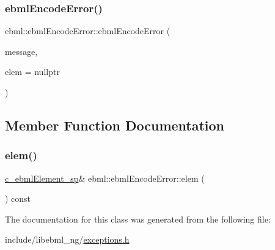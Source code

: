\subsubsection{\texorpdfstring{ebml\+Encode\+Error()}{ebmlEncodeError()}}
{\footnotesize\ttfamily ebml\+::ebml\+Encode\+Error\+::ebml\+Encode\+Error (\begin{DoxyParamCaption}\item[{const std\+::string \&}]{message,  }\item[{const \mbox{\hyperlink{namespaceebml_a2deef4e8071531b32e3533f1bf978917}{c\+\_\+ebml\+Element\+\_\+sp}} \&}]{elem = {\ttfamily nullptr} }\end{DoxyParamCaption})}



\subsection{Member Function Documentation}
\mbox{\label{classebml_1_1ebmlEncodeError_acea050cc554e717e4d9845c0cf34d473}} 
\subsubsection{\texorpdfstring{elem()}{elem()}}
{\footnotesize\ttfamily \mbox{\hyperlink{namespaceebml_a2deef4e8071531b32e3533f1bf978917}{c\+\_\+ebml\+Element\+\_\+sp}}\& ebml\+::ebml\+Encode\+Error\+::elem (\begin{DoxyParamCaption}{ }\end{DoxyParamCaption}) const}



The documentation for this class was generated from the following file\+:\begin{DoxyCompactItemize}
\item 
include/libebml\+\_\+ng/\mbox{\hyperlink{exceptions_8h}{exceptions.\+h}}\end{DoxyCompactItemize}
